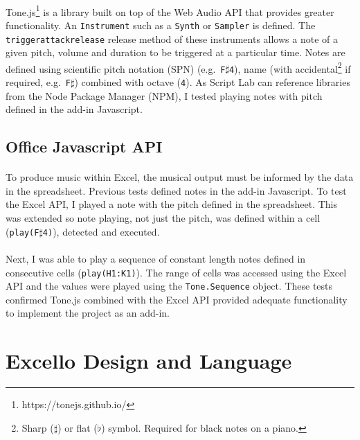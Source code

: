 \paragraph{} Tone.js\footnote{https://tonejs.github.io/} is a library built on top of the Web Audio API that provides greater functionality. An \texttt{Instrument} such as a \texttt{Synth} or \texttt{Sampler} is defined. The \texttt{triggerattackrelease} release method of these instruments allows a note of a given pitch, volume and duration to be triggered at a particular time. Notes are defined using scientific pitch notation (SPN) (e.g.~\texttt{F$\sharp$4}), name (with accidental\footnote{Sharp ($\sharp$) or flat ($\flat$) symbol. Required for black notes on a piano.} if required, e.g.~\texttt{F$\sharp$}) combined with octave (\texttt{4}). As Script Lab can reference libraries from the Node Package Manager (NPM), I tested playing notes with pitch defined in the add-in Javascript.

\subsection{Office Javascript API}

\paragraph{} To produce music within Excel, the musical output must be informed by the data in the spreadsheet. Previous tests defined notes in the add-in Javascript. To test the Excel API, I played a note with the pitch defined in the spreadsheet. This was extended so note playing, not just the pitch, was defined within a cell (\texttt{play(F$\sharp$4)}), detected and executed.

\paragraph{} Next, I was able to play a sequence of constant length notes defined in consecutive cells (\texttt{play(H1:K1)}). The range of cells was accessed using the Excel API and the values were played using the \texttt{Tone.Sequence} object. These tests confirmed Tone.js combined with the Excel API provided adequate functionality to implement the project as an add-in.

\section{Excello Design and Language}

